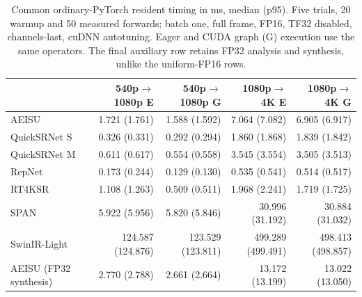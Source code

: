 \begin{table}[t]
\centering\small
\caption{Common ordinary-PyTorch resident timing in ms, median (p95). Five trials, 20 warmup and 50 measured forwards; batch one, full frame, FP16, TF32 disabled, channels-last, cuDNN autotuning. Eager and CUDA graph (G) execution use the same operators. The final auxiliary row retains FP32 analysis and synthesis, unlike the uniform-FP16 rows.}
\label{tab:common-runtime}
\begin{tabularx}{\textwidth}{Yrrrr}
\toprule
 & 540p$\to$1080p E & 540p$\to$1080p G & 1080p$\to$4K E & 1080p$\to$4K G\\
\midrule
AEISU & 1.721 (1.761) & 1.588 (1.592) & 7.064 (7.082) & 6.905 (6.917)\\
QuickSRNet S & 0.326 (0.331) & 0.292 (0.294) & 1.860 (1.868) & 1.839 (1.842)\\
QuickSRNet M & 0.611 (0.617) & 0.554 (0.558) & 3.545 (3.554) & 3.505 (3.513)\\
RepNet & 0.173 (0.244) & 0.129 (0.130) & 0.535 (0.541) & 0.514 (0.517)\\
RT4KSR & 1.108 (1.263) & 0.509 (0.511) & 1.968 (2.241) & 1.719 (1.725)\\
SPAN & 5.922 (5.956) & 5.820 (5.846) & 30.996 (31.192) & 30.884 (31.032)\\
SwinIR-Light & 124.587 (124.876) & 123.529 (123.811) & 499.289 (499.491) & 498.413 (498.857)\\
AEISU (FP32 synthesis) & 2.770 (2.788) & 2.661 (2.664) & 13.172 (13.199) & 13.022 (13.050)\\
\bottomrule
\end{tabularx}
\end{table}
